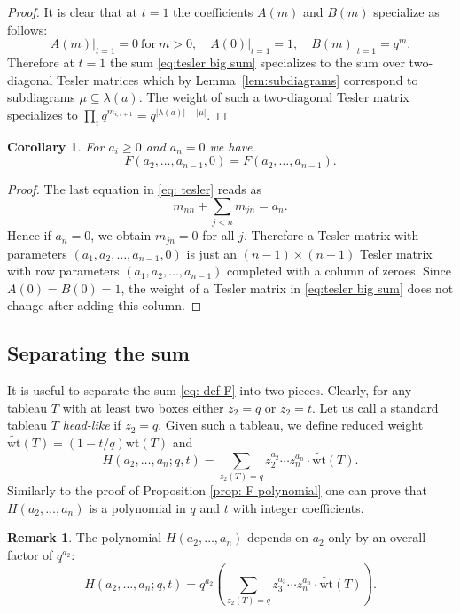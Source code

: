 \documentclass[11pt,reqno]{amsart}
\newcommand{\defn}[1]{{\color{darkred}\emph{#1}}} %
\newcommand{\wt}{\mathrm{wt}}
\newcommand{\twt}{\widetilde{\wt}}
\newtheorem{corollary}[theorem]{Corollary}
\theoremstyle{definition}
\newtheorem{remark}[theorem]{Remark}
\numberwithin{equation}{section}
\begin{document}
\begin{proof}
It is clear that at $t=1$ the coefficients $A(m)$ and $B(m)$ specialize as follows:
\[
	A(m)\Big|_{t=1}=0\ \text{for}\ m>0, \quad A(0)\Big|_{t=1}=1, \quad  B(m)\Big|_{t=1}=q^{m}.
\]
Therefore at $t=1$ the sum \eqref{eq:tesler big sum} specializes to the sum over two-diagonal Tesler matrices which by 
Lemma~\ref{lem:subdiagrams} correspond to subdiagrams $\mu\subseteq \lambda(a)$. The weight of such a 
two-diagonal Tesler matrix specializes to $\prod_i q^{m_{i,i+1}}=q^{|\lambda(a)|-|\mu|}$.
\end{proof}

\begin{corollary}
\label{cor:set 0}
For $a_i\geqslant 0$ and $a_n=0$ we have
\[
	F(a_2,\ldots,a_{n-1},0)=F(a_2,\ldots,a_{n-1}).
\]
\end{corollary}

\begin{proof}
The last equation in \eqref{eq: tesler} reads as
\[
	m_{nn}+\sum_{j<n}m_{jn}=a_{n}.
\]
Hence if $a_n=0$, we obtain $m_{jn}=0$ for all $j$. Therefore a Tesler matrix with parameters $(a_1,a_2,\ldots,a_{n-1},0)$ is 
just an $(n-1)\times (n-1)$ Tesler matrix with row parameters $(a_1,a_2,\ldots,a_{n-1})$ completed with a column of 
zeroes. Since $A(0)=B(0)=1$, the weight of a Tesler matrix in \eqref{eq:tesler big sum} does not change after 
adding this column.
\end{proof}

\subsection{Separating the sum}

It is useful to separate the sum \eqref{eq: def F} into two pieces. Clearly, for any tableau $T$ with at least two boxes
either $z_2=q$ or $z_2=t$. Let us call a standard tableau $T$ \defn{head-like} if $z_2=q$. Given such a tableau, we define 
reduced weight $\twt(T)=(1-t/q)\wt(T)$ and 
$$
	H(a_2,\ldots,a_n;q,t)=\sum_{z_2(T)=q}z_2^{a_2}\cdots z_n^{a_n}\cdot \twt(T).
$$
Similarly to the proof of Proposition \ref{prop: F polynomial} one can prove that $H(a_2,\ldots,a_n)$ is a polynomial 
in $q$ and $t$ with integer coefficients.

\begin{remark}
\label{rem: a_2 monomial in H}
The polynomial $H(a_2,\ldots,a_n)$ depends on $a_2$ only by an overall factor of $q^{a_2}$:
$$
	H(a_2,\ldots,a_n;q,t)=q^{a_2}\left(\sum_{z_2(T)=q}z_3^{a_3}\cdots z_n^{a_n}\cdot \twt(T)\right).
$$
\end{remark}
\end{document}
